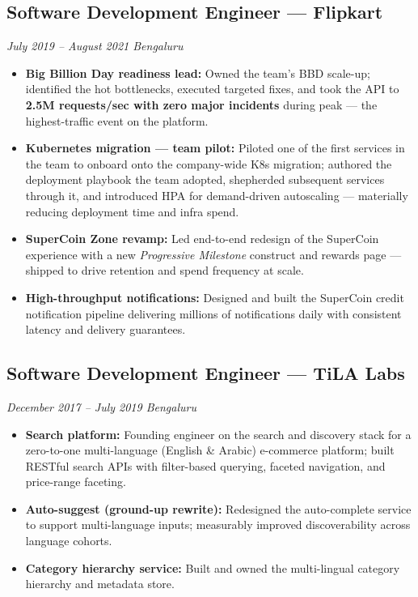 \documentclass[10pt,a4paper]{article}
\newcommand{\role}[4]{%
    \subsection*{#1 \textnormal{---} #2}%
    \vspace{-4pt}%
    {\color{muted}\textit{#3 \textbar{} #4}}%
    \vspace{2pt}%
}
\newcommand{\tag}[1]{\textbf{#1:}}
\begin{document}
\role{Software Development Engineer}{Flipkart}{July 2019 -- August 2021}{Bengaluru}
\begin{itemize}
    \item \tag{Big Billion Day readiness lead} Owned the team's BBD scale-up; identified the hot bottlenecks, executed targeted fixes, and took the API to \textbf{2.5M requests/sec with zero major incidents} during peak --- the highest-traffic event on the platform.
    \item \tag{Kubernetes migration — team pilot} Piloted one of the first services in the team to onboard onto the company-wide K8s migration; authored the deployment playbook the team adopted, shepherded subsequent services through it, and introduced HPA for demand-driven autoscaling — materially reducing deployment time and infra spend.
    \item \tag{SuperCoin Zone revamp} Led end-to-end redesign of the SuperCoin experience with a new \textit{Progressive Milestone} construct and rewards page --- shipped to drive retention and spend frequency at scale.
    \item \tag{High-throughput notifications} Designed and built the SuperCoin credit notification pipeline delivering millions of notifications daily with consistent latency and delivery guarantees.
\end{itemize}

\role{Software Development Engineer}{TiLA Labs}{December 2017 -- July 2019}{Bengaluru}
\begin{itemize}

    \item \tag{Search platform} Founding engineer on the search and discovery stack for a zero-to-one multi-language (English \& Arabic) e-commerce platform; built RESTful search APIs with filter-based querying, faceted navigation, and price-range faceting.
    \item \tag{Auto-suggest (ground-up rewrite)} Redesigned the auto-complete service to support multi-language inputs; measurably improved discoverability across language cohorts.
    \item \tag{Category hierarchy service} Built and owned the multi-lingual category hierarchy and metadata store.
\end{itemize}
\end{document}
